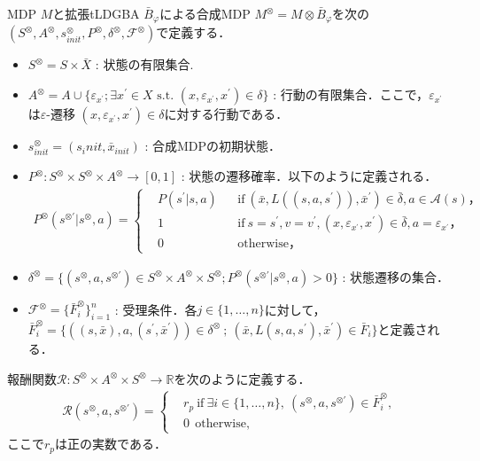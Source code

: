 \documentclass[a4j,9pt,twocolumn]{jsarticle}
\theoremstyle{definition}
\begin{document}
MDP $M$と拡張tLDGBA $\bar{B}_{\varphi}$による合成MDP $M^{\otimes} = M \otimes \bar{B}_{\varphi}$を次の$(S^{\otimes}, A^{\otimes}, s_{init}^{\otimes}, P^{\otimes}, \delta^{\otimes}, {\mathcal F}^{\otimes})$で定義する．
\begin{itemize}
  \item $S^{\otimes} = S \times \bar{X}$ : 状態の有限集合.
  \item $A^{\otimes}=A \cup \{ \varepsilon_{x^{\prime}} ; \exists x^{\prime}\! \in \! X \text{ s.t. } (x,\varepsilon_{x^{\prime}}, x^{\prime}) \in \delta \}$ : 行動の有限集合．ここで，$\varepsilon_{x^{\prime}}$は$\varepsilon$-遷移 $(x,\varepsilon_{x^{\prime}}, x^{\prime}) \in \delta$に対する行動である．
  \item $s^{\otimes}_{init} = (s_init,\bar{x}_{init})$ : 合成MDPの初期状態．
  \item $P^{\otimes} : S^{\otimes} \times S^{\otimes} \times A^{\otimes} \to [0,1] $ : 状態の遷移確率．以下のように定義される．
  \begin{align}
    P^{\otimes}(s^{\otimes \prime} | s^{\otimes}, a) =
    \left\{
    \begin{aligned}
      &P(s^{\prime} | s, a) &   &\text{if}\  (\bar{x}, L((s,a,s^{\prime})), \bar{x}^{\prime}) \in \bar{\delta}, a \in \mathcal{A}(s)，\\
      &1 &   &\text{if}\ s\!=\!s^{\prime},v\!=\!v^{\prime},(x, \varepsilon_{x^{\prime}}, x^{\prime})\! \in \! \bar{\delta}, a=\varepsilon_{x^{\prime}}，\\
      &0 &   &\text{otherwise} ，
    \end{aligned}
    \right. \nonumber
  \end{align}
  \item $\delta^{\otimes}  = \{ (s^{\otimes}, a, s^{\otimes \prime}) \in S^{\otimes} \times A^{\otimes} \times S^{\otimes} ; P^{\otimes}(s^{\otimes \prime} | s^{\otimes}, a) > 0 \} $ : 状態遷移の集合．
  \item $\mathcal{F}^{\otimes} = \{ \bar{F}^{\otimes}_i \} _{i=1}^{n}$ : 受理条件．各$j \in \{ 1,\ldots,n \}$に対して，$\bar{F}^{\otimes}_i = \{ ((s,\bar{x}), a, (s^{\prime}, \bar{x}^{\prime})) \in \delta^{\otimes}\ ;\ (\bar{x}, L(s,a,s^{\prime}), \bar{x}^{\prime}) \in \bar{F}_i \}$と定義される．
\end{itemize}
報酬関数$\mathcal{R} :S^{\otimes} \times A^{\otimes} \times S^{\otimes} \rightarrow {\mathbb R}$を次のように定義する．
\begin{align}
    \mathcal{R}(s^{\otimes}, a, s^{\otimes \prime}) =
    \left\{
    \begin{aligned}
      &r_p \  \text{if}\ \exists i \in \! \{ 1, \ldots ,n \},\ (s^{\otimes}, a, s^{\otimes \prime}) \in \bar{F}^{\otimes}_i \!,\\
      &0   \ \ \text{otherwise},
    \end{aligned}
    \right.
  \label{reward}
  \end{align}
ここで$r_p$は正の実数である．
\end{document}

